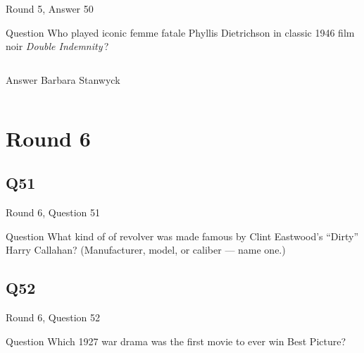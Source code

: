 \documentclass[11pt]{beamer}
\begin{document}
\begin{frame}[t]{Round 5, Answer 50}
  \vspace{2em}
  \begin{block}{Question}
    Who played iconic femme fatale Phyllis Dietrichson in classic 1946 film noir \emph{Double Indemnity}\,?
  \end{block}
  \pause{}
  \begin{columns}[T,totalwidth=\linewidth]
    \begin{column}{0.35\linewidth}
      \begin{block}{Answer}
        Barbara Stanwyck
      \end{block}
    \end{column}
    \begin{column}{0.6\linewidth}
      \begin{center}
        \texttt{[image: \{Images/stanwyck\_doubleindemnity]}.png}
      \end{center}
    \end{column}
  \end{columns}
\end{frame}


\section{Round 6}


\subsection*{Q51}
\begin{frame}[t]{Round 6, Question 51}
  \vspace{2em}
  \begin{block}{Question}
    What kind of of revolver was made famous by Clint Eastwood's ``Dirty'' Harry Callahan? (Manufacturer, model, or caliber — name one.)
  \end{block}
\end{frame}


\subsection*{Q52}
\begin{frame}[t]{Round 6, Question 52}
  \vspace{2em}
  \begin{block}{Question}
    Which 1927 war drama was the first movie to ever win Best Picture?
  \end{block}
\end{frame}
\end{document}
